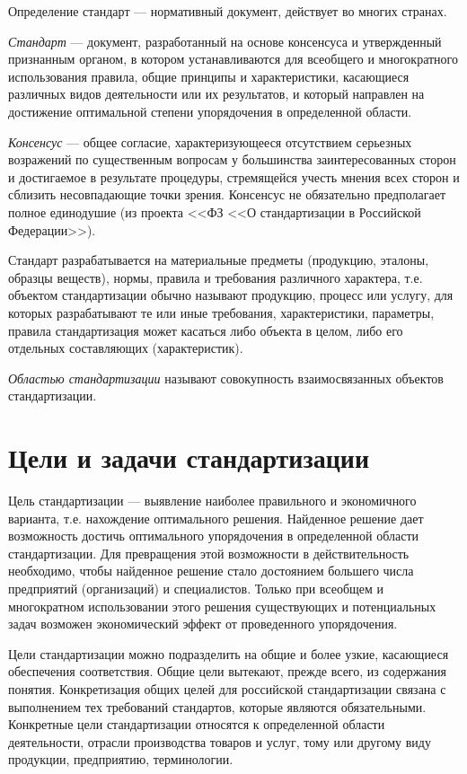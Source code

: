 Определение стандарт --- нормативный документ, действует во многих странах.

\textit{Стандарт} --- документ, разработанный на основе консенсуса и утвержденный признанным органом, в котором устанавливаются для всеобщего и многократного использования правила, общие принципы и характеристики, касающиеся различных видов деятельности или их результатов, и который направлен на достижение оптимальной степени упорядочения в определенной области.

\textit{Консенсус} --- общее согласие, характеризующееся отсутствием серьезных возражений по существенным вопросам у большинства заинтересованных сторон и достигаемое в результате процедуры, стремящейся учесть мнения всех сторон и сблизить несовпадающие точки зрения. Консенсус не обязательно предполагает полное единодушие (из проекта <<ФЗ <<О стандартизации в Российской Федерации>>).

Стандарт разрабатывается на материальные предметы (продукцию, эталоны, образцы веществ), нормы, правила и требования различного характера, т.е. объектом стандартизации обычно называют продукцию, процесс или услугу, для которых разрабатывают те или иные требования, характеристики, параметры, правила стандартизация может касаться либо объекта в целом, либо его отдельных составляющих (характеристик).

\textit{Областью стандартизации} называют совокупность взаимосвязанных объектов стандартизации.

\section{Цели и задачи стандартизации}

Цель стандартизации --- выявление наиболее правильного и экономичного варианта, т.е. нахождение оптимального решения. Найденное решение дает возможность достичь оптимального упорядочения в определенной области стандартизации. Для превращения этой возможности в действительность необходимо, чтобы найденное решение стало достоянием большего числа предприятий (организаций) и специалистов. Только при всеобщем и многократном использовании этого решения существующих и потенциальных задач возможен экономический эффект от проведенного упорядочения.

Цели стандартизации можно подразделить на общие и более узкие, касающиеся обеспечения соответствия. Общие цели вытекают, прежде всего, из содержания понятия. Конкретизация общих целей для российской стандартизации связана с выполнением тех требований стандартов, которые являются обязательными. Конкретные цели стандартизации относятся к определенной области деятельности, отрасли производства товаров и услуг, тому или другому виду продукции, предприятию, терминологии.


